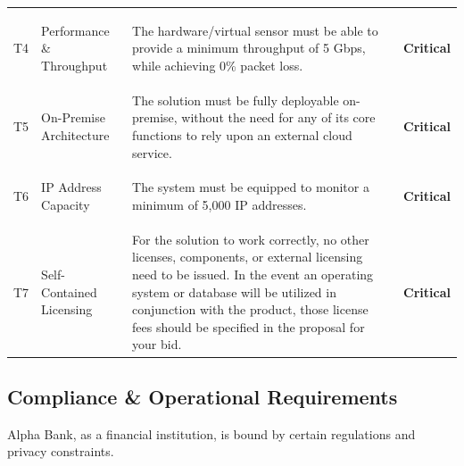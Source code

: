 \documentclass[12pt,a4paper]{report}
\newcommand{\critical}{\textbf{Critical}}
\begin{document}
\begin{xltabular}{\textwidth}{c >{\bfseries\raggedright\arraybackslash}p{3.2cm} >{\raggedright\arraybackslash}X c}
    T4 & Performance \& Throughput &
    The hardware/virtual sensor must be able to provide a minimum throughput of 5 Gbps, while achieving 0\% packet loss. & \critical \\
    
    T5 & On-Premise Architecture &
    The solution must be fully deployable on-premise, without the need for any of its core functions to rely upon an external cloud service. & \critical \\
    
    T6 & IP Address Capacity &
    The system must be equipped to monitor a minimum of 5,000 IP addresses. & \critical \\
    
    T7 & Self-Contained Licensing &
    For the solution to work correctly, no other licenses, components, or external licensing need to be issued. In the event an operating system or database will be utilized in conjunction with the product, those license fees should be specified in the proposal for your bid. & \critical \\
    
\end{xltabular}

\subsection{Compliance \& Operational Requirements}

Alpha Bank, as a financial institution, is bound by certain regulations and privacy constraints.
\end{document}
